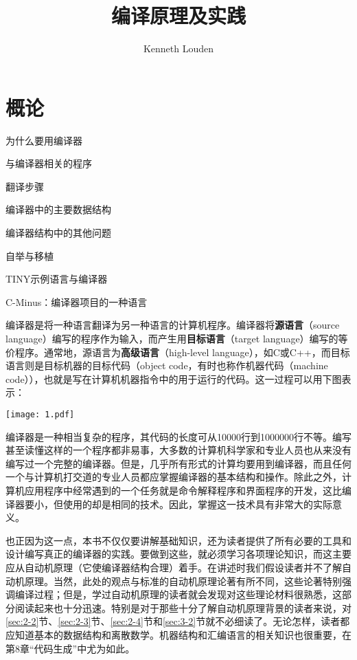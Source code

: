 \documentclass[lang=cn,10pt]{elegantbook}
\title{编译原理及实践}
\author{Kenneth Louden}
\begin{document}
\maketitle
\frontmatter

\tableofcontents

\mainmatter

\chapter{概论}
\label{chap:1}

\begin{introduction}
  \item 为什么要用编译器
  \item 与编译器相关的程序
  \item 翻译步骤
  \item 编译器中的主要数据结构
  \item 编译器结构中的其他问题
  \item 自举与移植
  \item TINY示例语言与编译器
  \item C-Minus：编译器项目的一种语言
\end{introduction}

编译器是将一种语言翻译为另一种语言的计算机程序。编译器将\textbf{源语言}（source language）编写的程序作为输入，而产生用\textbf{目标语言}（target language）编写的等价程序。通常地，源语言为\textbf{高级语言}（high-level language），如C或C++，而目标语言则是目标机器的目标代码（object code，有时也称作机器代码（machine code）），也就是写在计算机机器指令中的用于运行的代码。这一过程可以用下图表示：

\begin{center}
  \texttt{[image: 1.pdf]}
\end{center}

编译器是一种相当复杂的程序，其代码的长度可从10000行到1000000行不等。编写甚至读懂这样的一个程序都非易事，大多数的计算机科学家和专业人员也从来没有编写过一个完整的编译器。但是，几乎所有形式的计算均要用到编译器，而且任何一个与计算机打交道的专业人员都应掌握编译器的基本结构和操作。除此之外，计算机应用程序中经常遇到的一个任务就是命令解释程序和界面程序的开发，这比编译器要小，但使用的却是相同的技术。因此，掌握这一技术具有非常大的实际意义。

也正因为这一点，本书不仅仅要讲解基础知识，还为读者提供了所有必要的工具和设计编写真正的编译器的实践。要做到这些，就必须学习各项理论知识，而这主要应从自动机原理（它使编译器结构合理）着手。在讲述时我们假设读者并不了解自动机原理。当然，此处的观点与标准的自动机原理论著有所不同，这些论著特别强调编译过程；但是，学过自动机原理的读者就会发现对这些理论材料很熟悉，这部分阅读起来也十分迅速。特别是对于那些十分了解自动机原理背景的读者来说，对\ref{sec:2-2}节、\ref{sec:2-3}节、\ref{sec:2-4}节和\ref{sec:3-2}节就不必细读了。无论怎样，读者都应知道基本的数据结构和离散数学。机器结构和汇编语言的相关知识也很重要，在第8章“代码生成”中尤为如此。
\end{document}
